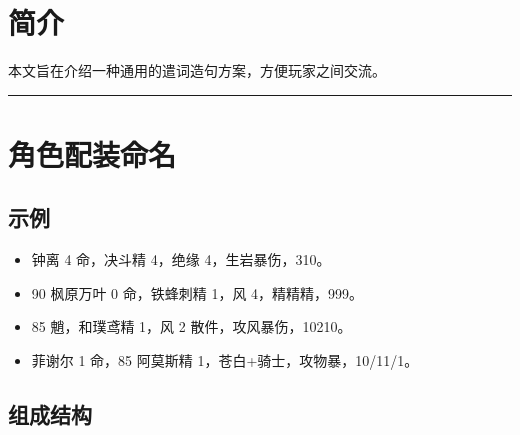 
\uselangzh

\usepackage{longtable}
\usepackage{tabu}

\setlength{\tabulinesep}{6pt}




\section*{简介}

本文旨在介绍一种通用的遣词造句方案，方便玩家之间交流。

\maketoc{}{}

\vspace{2em}
\hrule

\section{角色配装命名}

\subsection{示例}

\begin{itemize}
	\item 钟离 4 命，决斗精 4，绝缘 4，生岩暴伤，310。
	\item 90 枫原万叶 0 命，铁蜂刺精 1，风 4，精精精，999。
	\item 85 魈，和璞鸢精 1，风 2 散件，攻风暴伤，10210。
	\item 菲谢尔 1 命，85 阿莫斯精 1，苍白+骑士，攻物暴，10/11/1。
\end{itemize}

\subsection{组成结构}

